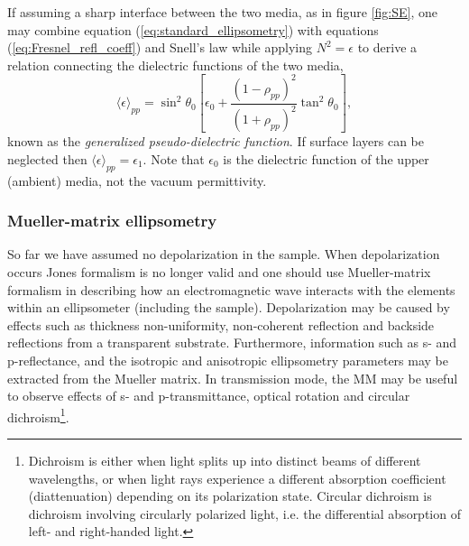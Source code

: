 If assuming a sharp interface between the two media, as in figure \ref{fig:SE}, one may combine equation (\ref{eq:standard_ellipsometry}) with equations (\ref{eq:Fresnel_refl_coeff}) and Snell's law while applying $N^2=\epsilon$ to derive a relation connecting the dielectric functions of the two media,
\begin{equation}
    \langle\epsilon\rangle_{pp} =  \sin^2\theta_0\left[ \epsilon_0 + \frac{(1-\rho_{pp})^2}{(1+\rho_{pp})^2}\tan^2\theta_0 \right],
    \label{eq:generalized_pseudo_dielectricfunction}
\end{equation}
known as the \emph{generalized pseudo-dielectric function}\cite{hans_arwin_reviewarticle}. If surface layers can be neglected then $\langle\epsilon\rangle_{pp}=\epsilon_1$. Note that $\epsilon_0$ is the dielectric function of the upper (ambient) media, not the vacuum permittivity. %

\subsubsection{Mueller-matrix ellipsometry}
\label{sec:MM_ellipsometry}
So far we have assumed no depolarization in the sample. When depolarization occurs Jones formalism is no longer valid and one should use Mueller-matrix formalism in describing how an electromagnetic wave interacts with the elements within an ellipsometer (including the sample). Depolarization may be caused by effects such as thickness non-uniformity, non-coherent reflection and backside reflections from a transparent substrate. Furthermore, information such as s- and p-reflectance, and the isotropic and anisotropic ellipsometry parameters may be extracted from the Mueller matrix. In transmission mode, the MM may be useful to observe effects of s- and p-transmittance, optical rotation and circular dichroism\footnote{Dichroism is either when light splits up into distinct beams of different wavelengths, or when light rays experience a different absorption coefficient (diattenuation) depending on its polarization state. Circular dichroism is dichroism involving circularly polarized light, i.e. the differential absorption of left- and right-handed light.}.

